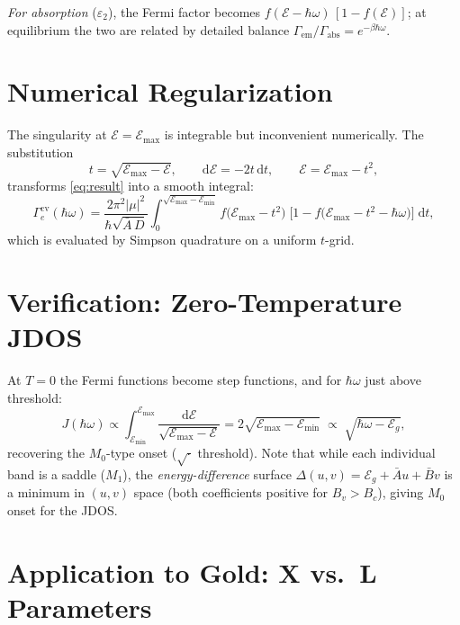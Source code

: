\documentclass[11pt,a4paper]{article}
\newcommand{\E}{\mathcal{E}}              %
\newcommand{\Eg}{\E_g}
\newcommand{\Emax}{\E_{\max}}
\newcommand{\Emin}{\E_{\min}}
\newcommand{\Abar}{\bar{A}}
\newcommand{\Bbar}{\bar{B}}
\newcommand{\hw}{\hbar\omega}
\newcommand{\dd}{\mathrm{d}}
\begin{document}
\emph{For absorption} ($\varepsilon_2$), the Fermi factor becomes $f(\E - \hw)\,[1 - f(\E)]$; at equilibrium the two are related by detailed balance $\Gamma_{\mathrm{em}}/\Gamma_{\mathrm{abs}} = e^{-\beta\hw}$.

\section{Numerical Regularization}

The singularity at $\E = \Emax$ is integrable but inconvenient numerically. The substitution
\begin{equation}
  t = \sqrt{\Emax - \E}, \qquad \dd\E = -2t\,\dd t, \qquad \E = \Emax - t^2,
\end{equation}
transforms \eqref{eq:result} into a smooth integral:
\begin{equation}\label{eq:regularized}
  \Gamma_e^{\mathrm{cv}}(\hw)
  = \frac{2\pi^2|\mu|^2}{\hbar\sqrt{\Abar\,D}}
  \int_0^{\sqrt{\Emax - \Emin}}
  f\!\bigl(\Emax - t^2\bigr)\;
  \bigl[1 - f\!\bigl(\Emax - t^2 - \hw\bigr)\bigr]
  \;\dd t,
\end{equation}
which is evaluated by Simpson quadrature on a uniform $t$-grid.

\section{Verification: Zero-Temperature JDOS}

At $T=0$ the Fermi functions become step functions, and for $\hw$ just above threshold:
\begin{equation}
  J(\hw) \propto \int_{\Emin}^{\Emax} \frac{\dd\E}{\sqrt{\Emax - \E}}
  = 2\sqrt{\Emax - \Emin}
  \;\propto\; \sqrt{\hw - \Eg},
\end{equation}
recovering the $M_0$-type onset ($\sqrt{\cdot}$ threshold). Note that while each individual band is a saddle ($M_1$), the \emph{energy-difference} surface $\Delta(u,v) = \Eg + \Abar u + \Bbar v$ is a minimum in $(u,v)$ space (both coefficients positive for $B_v > B_c$), giving $M_0$ onset for the JDOS.

\section{Application to Gold: X vs.\ L Parameters}
\end{document}
